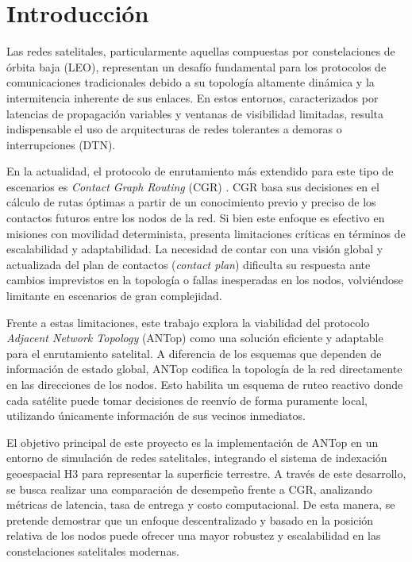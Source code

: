 \chapter{Introducción}

Las redes satelitales, particularmente aquellas compuestas por constelaciones de órbita baja (LEO), representan un desafío fundamental para los protocolos de comunicaciones tradicionales debido a su topología altamente dinámica y la intermitencia inherente de sus enlaces. En estos entornos, caracterizados por latencias de propagación variables y ventanas de visibilidad limitadas, resulta indispensable el uso de arquitecturas de redes tolerantes a demoras o interrupciones (DTN).

En la actualidad, el protocolo de enrutamiento más extendido para este tipo de escenarios es \textit{Contact Graph Routing} (CGR) \cite{burleigh-dtnrg-cgr-01}. CGR basa sus decisiones en el cálculo de rutas óptimas a partir de un conocimiento previo y preciso de los contactos futuros entre los nodos de la red. Si bien este enfoque es efectivo en misiones con movilidad determinista, presenta limitaciones críticas en términos de escalabilidad y adaptabilidad. La necesidad de contar con una visión global y actualizada del plan de contactos (\textit{contact plan}) dificulta su respuesta ante cambios imprevistos en la topología o fallas inesperadas en los nodos, volviéndose limitante en escenarios de gran complejidad.

Frente a estas limitaciones, este trabajo explora la viabilidad del protocolo \textit{Adjacent Network Topology} (ANTop) \cite{marcu2007antop} como una solución eficiente y adaptable para el enrutamiento satelital. A diferencia de los esquemas que dependen de información de estado global, ANTop codifica la topología de la red directamente en las direcciones de los nodos. Esto habilita un esquema de ruteo reactivo donde cada satélite puede tomar decisiones de reenvío de forma puramente local, utilizando únicamente información de sus vecinos inmediatos.

El objetivo principal de este proyecto es la implementación de ANTop en un entorno de simulación de redes satelitales, integrando el sistema de indexación geoespacial H3 para representar la superficie terrestre. A través de este desarrollo, se busca realizar una comparación de desempeño frente a CGR, analizando métricas de latencia, tasa de entrega y costo computacional. De esta manera, se pretende demostrar que un enfoque descentralizado y basado en la posición relativa de los nodos puede ofrecer una mayor robustez y escalabilidad en las constelaciones satelitales modernas.
